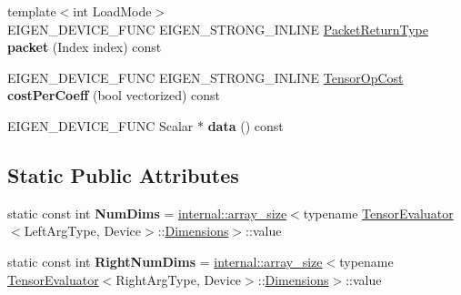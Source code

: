 \begin{DoxyCompactItemize}
{\footnotesize template$<$int Load\+Mode$>$ }\\E\+I\+G\+E\+N\+\_\+\+D\+E\+V\+I\+C\+E\+\_\+\+F\+U\+NC E\+I\+G\+E\+N\+\_\+\+S\+T\+R\+O\+N\+G\+\_\+\+I\+N\+L\+I\+NE \hyperlink{group___sparse_core___module}{Packet\+Return\+Type} {\bfseries packet} (Index index) const
\item 
\mbox{\label{struct_eigen_1_1_tensor_evaluator_3_01const_01_tensor_concatenation_op_3_01_axis_00_01_left_arg_e37e1b61d31098a96aab7c22793b325c_a51a0ebd3dd7a9a90d7863709d64b4f44}} 
E\+I\+G\+E\+N\+\_\+\+D\+E\+V\+I\+C\+E\+\_\+\+F\+U\+NC E\+I\+G\+E\+N\+\_\+\+S\+T\+R\+O\+N\+G\+\_\+\+I\+N\+L\+I\+NE \hyperlink{class_eigen_1_1_tensor_op_cost}{Tensor\+Op\+Cost} {\bfseries cost\+Per\+Coeff} (bool vectorized) const
\item 
\mbox{\label{struct_eigen_1_1_tensor_evaluator_3_01const_01_tensor_concatenation_op_3_01_axis_00_01_left_arg_e37e1b61d31098a96aab7c22793b325c_a815385b4c39c8c7cc21f92663b49f383}} 
E\+I\+G\+E\+N\+\_\+\+D\+E\+V\+I\+C\+E\+\_\+\+F\+U\+NC Scalar $\ast$ {\bfseries data} () const
\end{DoxyCompactItemize}
\subsection*{Static Public Attributes}
\begin{DoxyCompactItemize}
\item 
\mbox{\label{struct_eigen_1_1_tensor_evaluator_3_01const_01_tensor_concatenation_op_3_01_axis_00_01_left_arg_e37e1b61d31098a96aab7c22793b325c_ac512857a7a4a6c1f4bfc666e0c8974c9}} 
static const int {\bfseries Num\+Dims} = \hyperlink{struct_eigen_1_1internal_1_1array__size}{internal\+::array\+\_\+size}$<$typename \hyperlink{struct_eigen_1_1_tensor_evaluator}{Tensor\+Evaluator}$<$Left\+Arg\+Type, Device$>$\+::\hyperlink{struct_eigen_1_1_d_sizes}{Dimensions}$>$\+::value
\item 
\mbox{\label{struct_eigen_1_1_tensor_evaluator_3_01const_01_tensor_concatenation_op_3_01_axis_00_01_left_arg_e37e1b61d31098a96aab7c22793b325c_abf2c80fab776194bf2130f6de2570dea}} 
static const int {\bfseries Right\+Num\+Dims} = \hyperlink{struct_eigen_1_1internal_1_1array__size}{internal\+::array\+\_\+size}$<$typename \hyperlink{struct_eigen_1_1_tensor_evaluator}{Tensor\+Evaluator}$<$Right\+Arg\+Type, Device$>$\+::\hyperlink{struct_eigen_1_1_d_sizes}{Dimensions}$>$\+::value
\end{DoxyCompactItemize}
